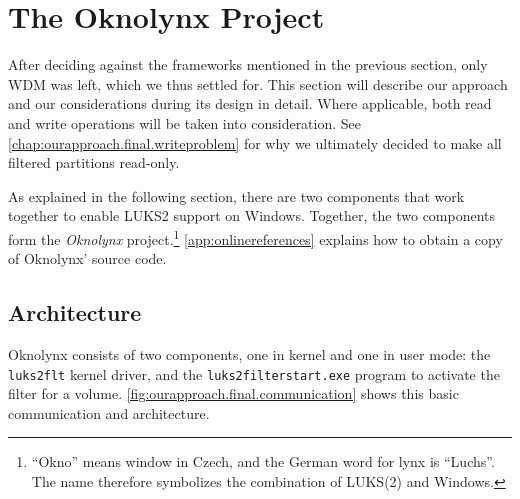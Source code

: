 \section{The Oknolynx Project}
\label{chap:ourapproach.final}
After deciding against the frameworks mentioned in the previous section, only WDM was left, which we thus settled for. This section will describe our approach and our considerations during its design in detail. Where applicable, both read and write operations will be taken into consideration. See \autoref{chap:ourapproach.final.writeproblem} for why we ultimately decided to make all filtered partitions read-only.

As explained in the following section, there are two components that work together to enable LUKS2 support on Windows. Together, the two components form the \emph{Oknolynx} project.\footnote{\label{fn:ourapproach.final.oknolynx} ``Okno'' means window in Czech, and the German word for lynx is ``Luchs''. The name therefore symbolizes the combination of LUKS(2) and Windows.} \autoref{app:onlinereferences} explains how to obtain a copy of Oknolynx' source code.

\subsection{Architecture}
\label{chap:ourapproach.final.architecture}
Oknolynx consists of two components, one in kernel and one in user mode: the \texttt{luks2flt} kernel driver, and the \texttt{luks2filterstart.exe} program to activate the filter for a volume. \autoref{fig:ourapproach.final.communication} shows this basic communication and architecture.


